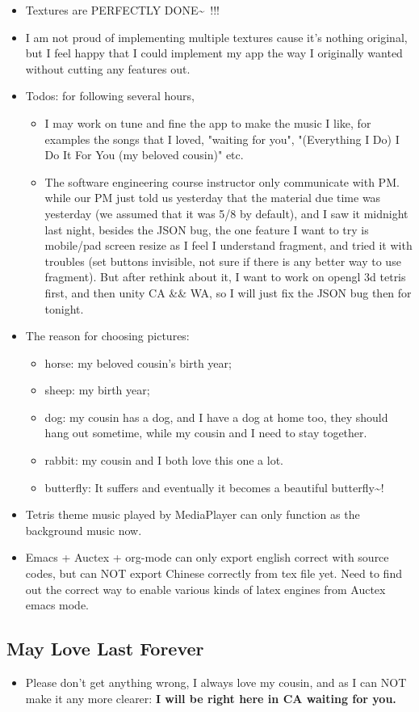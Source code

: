\documentclass[9pt,b5paper]{article}
\begin{document}
\begin{itemize}
\item Textures are PERFECTLY DONE\textasciitilde{}~!!!
\item I am not proud of implementing multiple textures cause it's nothing original, but I feel happy that I could implement my app the way I originally wanted without cutting any features out.
\item Todos: for following several hours, 
\begin{itemize}
\item I may work on tune and fine the app to make the music I like, for examples the songs that I loved, "waiting for you", "(Everything I Do) I Do It For You (my beloved cousin)" etc.
\item The software engineering course instructor only communicate with PM. while our PM just told us yesterday that the material due time was yesterday (we assumed that it was 5/8 by default), and I saw it midnight last night, besides the JSON bug, the one feature I want to try is mobile/pad screen resize as I feel I understand fragment, and tried it with troubles (set buttons invisible, not sure if there is any better way to use fragment). But after rethink about it, I want to work on opengl 3d tetris first, and then unity CA \&\& WA, so I will just fix the JSON bug then for tonight.
\end{itemize}
\item The reason for choosing pictures: 
\begin{itemize}
\item horse: my beloved cousin's birth year;
\item sheep: my birth year;
\item dog: my cousin has a dog, and I have a dog at home too, they should hang out sometime, while my cousin and I need to stay together.
\item rabbit: my cousin and I both love this one a lot.
\item butterfly: It suffers and eventually it becomes a beautiful butterfly\textasciitilde{}!
\end{itemize}
\item Tetris theme music played by MediaPlayer can only function as the background music now.
\item Emacs + Auctex + org-mode can only export english correct with source codes, but can NOT export Chinese correctly from tex file yet. Need to find out the correct way to enable various kinds of latex engines from Auctex emacs mode.
\end{itemize}
\subsection{May Love Last Forever}
\label{sec-1-1}
\begin{itemize}
\item Please don't get anything wrong, I always love my cousin, and as I can NOT make it any more clearer: \textbf{I will be right here in CA waiting for you.}
\end{itemize}
\end{document}
